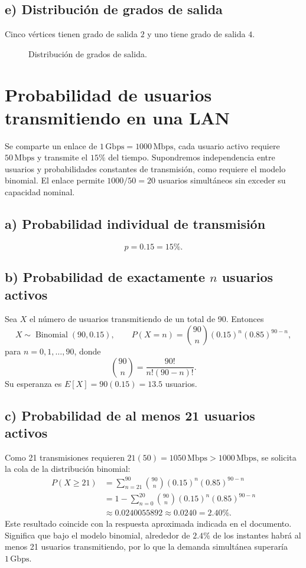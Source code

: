 \documentclass[12pt,a4paper]{article}
\begin{document}
\subsection*{e) Distribución de grados de salida}
Cinco vértices tienen grado de salida $2$ y uno tiene grado de salida $4$.
\begin{figure}[H]\centering
{}
\caption{Distribución de grados de salida.}
\end{figure}

\section{Probabilidad de usuarios transmitiendo en una LAN}
Se comparte un enlace de $1\,\mathrm{Gbps}=1000\,\mathrm{Mbps}$, cada usuario activo requiere $50\,\mathrm{Mbps}$ y transmite el $15\%$ del tiempo. Supondremos independencia entre usuarios y probabilidades constantes de transmisión, como requiere el modelo binomial. El enlace permite $1000/50=20$ usuarios simultáneos sin exceder su capacidad nominal.
\subsection*{a) Probabilidad individual de transmisión}
\[\boxed{p=0.15=15\%.}\]
\subsection*{b) Probabilidad de exactamente $n$ usuarios activos}
Sea $X$ el número de usuarios transmitiendo de un total de 90. Entonces
\[
X\sim\operatorname{Binomial}(90,0.15),\qquad
\boxed{P(X=n)=\binom{90}{n}(0.15)^n(0.85)^{90-n}},
\]
para $n=0,1,\ldots,90$, donde
\[\binom{90}{n}=\frac{90!}{n!(90-n)!}.\]
Su esperanza es $E[X]=90(0.15)=13.5$ usuarios.
\subsection*{c) Probabilidad de al menos 21 usuarios activos}
Como 21 transmisiones requieren $21(50)=1050\,\mathrm{Mbps}>1000\,\mathrm{Mbps}$, se solicita la cola de la distribución binomial:
\[
\begin{aligned}
P(X\ge21)&=\sum_{n=21}^{90}\binom{90}{n}(0.15)^n(0.85)^{90-n}\\
&=1-\sum_{n=0}^{20}\binom{90}{n}(0.15)^n(0.85)^{90-n}\\
&\approx \boxed{0.0240055892\approx 0.0240=2.40\%.}
\end{aligned}
\]
Este resultado coincide con la respuesta aproximada indicada en el documento. Significa que bajo el modelo binomial, alrededor de $2.4\%$ de los instantes habrá al menos 21 usuarios transmitiendo, por lo que la demanda simultánea superaría $1\,\mathrm{Gbps}$.
\end{document}
